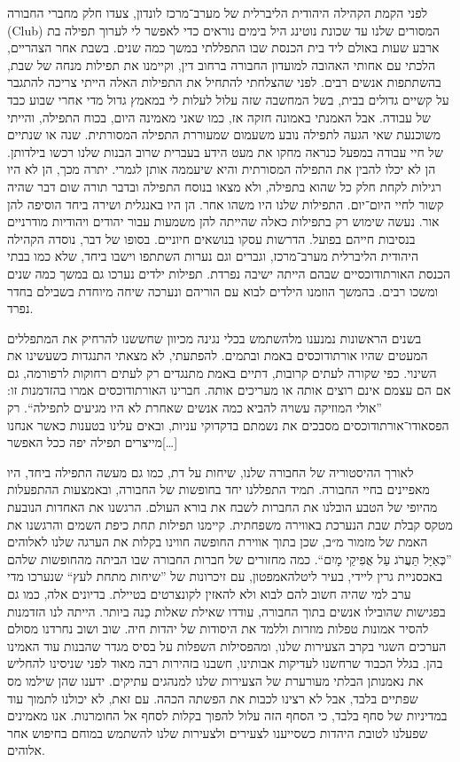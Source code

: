\documentclass[14pt, article, extrafontsizes, twopage, a4paper]{memoir}
\begin{document}
{לפני הקמת הקהילה היהודית הליברלית של מערב־מרכז לונדון, צעדו חלק מחברי החבורה (\textenglish{Club}) המסורים שלנו עד שכונת נוטינג היל בימים נוראים כדי לאפשר לי לערוך תפילה בת ארבע שעות באולם ליד בית הכנסת שבו התפללתי במשך כמה שנים. בשבת אחר הצהריים, הלכתי עם אחותי האהובה למועדון החבורה ברחוב דין, וקיימנו את תפילות מנחה של שבת, בהשתתפות אנשים רבים. לפני שהצלחתי להתחיל את התפילות האלה הייתי צריכה להתגבר על קשיים גדולים בבית, בשל המחשבה שזה עלול לעלות לי במאמץ גדול מדי אחרי שבוע כבד של עבודה. אבל האמנתי באמונה חזקה אז, כמו שאני מאמינה היום, בכוח התפילה, והייתי משוכנעת שאי הגעה לתפילה נובע משעמום שמעוררת התפילה המסורתית. שנה או שנתיים של חיי עבודה במפעל כנראה מחקו את מעט הידע בעברית שרוב הבנות שלנו רכשו בילדותן. הן לא יכלו להבין את התפילה המסורתית והיא שיעממה אותן לגמרי. יתרה מכך, הן לא היו רגילות לקחת חלק כל שהוא בתפילה, ולא מצאו בנוסח התפילה ובדבר תורה שום דבר שהיה קשור לחיי היום־יום. התפילות שלנו היו משהו אחר. הן היו באנגלית ושירה ביחד הוסיפה להן אור. נעשה שימוש רק בתפילות כאלה שהייתה להן משמעות עבור יהודים ויהודיות מודרניים בנסיבות חייהם בפועל. הדרשות עסקו בנושאים חיוניים. בסופו של דבר, נוסדה הקהילה היהודית הליברלית מערב־מרכז, וגברים וגם נערות השתתפו וישבו ביחד, שלא כמו בבתי הכנסת האורתודוכסיים שבהם הייתה ישיבה נפרדת. תפילות ילדים נערכו גם במשך כמה שנים ומשכו רבים. בהמשך הוזמנו הילדים לבוא עם הוריהם ונערכה שיחה מיוחדת בשבילם בחדר נפרד.

בשנים הראשונות נמנענו מלהשתמש בכלי נגינה מכיוון שחששנו להרחיק את המתפללים המעטים שהיו אורתודוכסים באמת ובתמים. להפתעתי, לא מצאתי התנגדות כשעשינו את השינוי. כפי שקורה לעתים קרובות, דתיים באמת מתנגדים רק לעתים רחוקות לרפורמה, גם אם הם עצמם אינם רוצים אותה או מעריכים אותה. חברינו האורתודוכסים אמרו בהזדמנות זו: ”אולי המוזיקה עשויה להביא כמה אנשים שאחרת לא היו מגיעים לתפילה“. רק הפסאודו־אורתודוכסים מסבכים את נשמתם בדקדוקי עניות, ובאים עלינו בטענות כאשר אנחנו מייצרים תפילה יפה ככל האפשר[…]

לאורך ההיסטוריה של החבורה שלנו, שיחות על דת, כמו גם מעשה התפילה ביחד, היו מאפיינים בחיי החבורה. תמיד התפללנו יחד בחופשות של החבורה, ובאמצעות ההתפעלות מהיופי של הטבע הובלנו את החברות לשבח את בורא העולם. הרגשנו את האחדות הנובעת מטקס קבלת שבת הנערכת באווירה משפחתית. קיימנו תפילות תחת כיפת השמים והרגשנו את האמת של מזמור מ״ב, שכן בתוך אווירת החופשה חווינו בקלות את הערגה שלנו לאלוהים ”כְּאַיָּל תַּעֲרֹג עַל אֲפִיקֵי מָיִם“. כמה מחזורים של חברות החבורה שבו הביתה מהחופשות שלהם באכסניית גרין ליידי, בעיר ליטלהאמפטון, עם זיכרונות של ”שיחות מתחת לעץ“ שנערכו מדי ערב למי שהיה חשוב להם לבוא ולא להאזין לקונצרטים בטיילת. בדיונים אלה, כמו גם בפגישות שהובילו אנשים בתוך החבורה, עודדו שאילת שאלות כֵנה ביותר. הייתה לנו הזדמנות להסיר אמונות טפלות מוזרות וללמד את היסודות של יהדות חיה. שוב ושוב נחרדנו מסולם הערכים השגוי בקרב הצעירות שלנו, ומהפסילות השפלות על בסיס מגדר שהבנות עוד האמינו בהן. בגלל הכבוד שרחשנו לעדיקות אבותינו, חשבנו בזהירות רבה מאוד לפני שניסינו להחליש את נאמנותן הבלתי מעורערת של הצעירות שלנו למנהגים עתיקים. ידענו שהן שילמו מס שפתיים בלבד, אבל לא רצינו לכבות את הפשתה הכהה. עם זאת, לא יכולנו לתמוך עוד במדיניות של סחף בלבד, כי הסחף הזה עלול להפוך בקלות לסחף אל החומרנות. אנו מאמינים שפעלנו לטובת היהדות כשסייענו לצעירים ולצעירות שלנו להשתמש במוחם בחיפוש אחר אלוהים.

}
\end{document}
